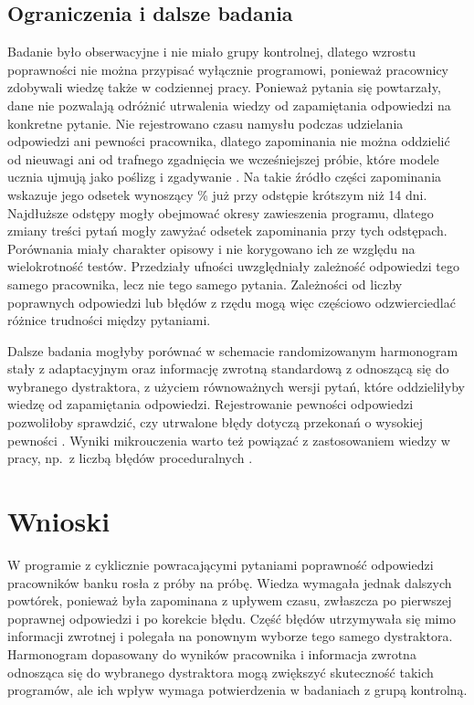 \subsection{Ograniczenia i dalsze badania}
Badanie było obserwacyjne i nie miało grupy kontrolnej, dlatego wzrostu poprawności nie można przypisać
wyłącznie programowi, ponieważ pracownicy zdobywali wiedzę także w codziennej pracy. Ponieważ pytania
się powtarzały, dane nie pozwalają odróżnić utrwalenia wiedzy od zapamiętania odpowiedzi na konkretne
pytanie. Nie rejestrowano czasu namysłu podczas udzielania odpowiedzi ani pewności pracownika, dlatego zapominania
nie można oddzielić od nieuwagi ani od trafnego zgadnięcia we wcześniejszej próbie, które modele ucznia
ujmują jako poślizg i zgadywanie \citep{corbett1994}. Na takie źródło części zapominania wskazuje jego
odsetek wynoszący \ForgetShort\% już przy odstępie krótszym niż 14 dni. Najdłuższe odstępy mogły
obejmować okresy zawieszenia programu, dlatego zmiany treści pytań mogły zawyżać odsetek zapominania
przy tych odstępach. Porównania miały charakter opisowy i nie korygowano ich ze względu na
wielokrotność testów. Przedziały ufności uwzględniały zależność odpowiedzi tego samego pracownika,
lecz nie tego samego pytania. Zależności od liczby poprawnych odpowiedzi lub błędów z rzędu mogą więc
częściowo odzwierciedlać różnice trudności między pytaniami.

Dalsze badania mogłyby porównać w schemacie randomizowanym harmonogram stały z adaptacyjnym oraz
informację zwrotną standardową z odnoszącą się do wybranego dystraktora, z użyciem równoważnych wersji
pytań, które oddzieliłyby wiedzę od zapamiętania odpowiedzi. Rejestrowanie pewności odpowiedzi
pozwoliłoby sprawdzić, czy utrwalone błędy dotyczą przekonań o wysokiej pewności \citep{butler2011}.
Wyniki mikrouczenia warto też powiązać z zastosowaniem wiedzy w pracy, np.\ z liczbą błędów
proceduralnych \citep{blume2010}.

\section{Wnioski}
W programie z cyklicznie powracającymi pytaniami poprawność odpowiedzi pracowników banku rosła z próby
na próbę. Wiedza wymagała jednak dalszych powtórek, ponieważ była zapominana z upływem czasu, zwłaszcza
po pierwszej poprawnej odpowiedzi i po korekcie błędu. Część błędów utrzymywała się mimo informacji
zwrotnej i polegała na ponownym wyborze tego samego dystraktora. Harmonogram dopasowany do wyników
pracownika i informacja zwrotna odnosząca się do wybranego dystraktora mogą zwiększyć skuteczność
takich programów, ale ich wpływ wymaga potwierdzenia w badaniach z grupą kontrolną.
